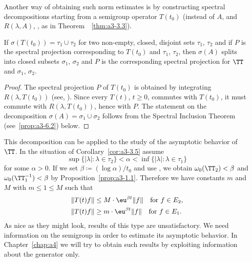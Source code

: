 Another way of obtaining such norm estimates is by constructing spectral decompositions starting from a semigroup operator $T(t_{0})$ (instead of\/ $A$, and $R(\lambda,A)$, \resp, as in Theorem~~\ref{thm:a3-3.3}).
\begin{corollary}\label{cor:a3-3.5}
If\/ $\sigma(T(t_{0})) = \tau_{1} \cup \tau_{2}$ for two non-empty, closed, disjoint sets $\tau_{1}$, $\tau_{2}$ and if\/ $P$ is the spectral projection corresponding to $T(t_{0})$ and $\tau_{1}$, $\tau_{2}$, then $\sigma(A)$ splits into closed subsets $\sigma_{1}$, $\sigma_{2}$ and $P$ is the corresponding spectral projection for $\TT$ and $\sigma_{1}$, $\sigma_{2}$.
\end{corollary}
\begin{proof}
The spectral projection $P$ of\/ $T(t_{0})$ is obtained by integrating $R(\lambda,T(t_{0}))$ (see, \eg \textcite[Section VII.3]{dunfordschwartz:1958}).
Since every $T(t)$, $t \geq 0$, commutes with $T(t_{0})$, it must commute with $R(\lambda,T(t_{0}))$, hence with $P$.
The statement on the decomposition $\sigma(A) = \sigma_{1} \cup \sigma_{2}$ follows from the Spectral Inclusion Theorem (see~\ref{prop:a3-6.2}) below.
\end{proof}
This decomposition can be applied to the study of the asymptotic behavior of\/ $\TT$. In the situation of Corollary~\ref{cor:a3-3.5} assume
\[
\sup \{|\lambda| \colon \lambda \in \tau_{2}\} < \alpha < \inf \{|\lambda| \colon \lambda \in \tau_{1}\} 
\]
for some $\alpha > 0$. 
If we set $\beta \coloneqq (\log\alpha)/t_{0}$ and use 
\textcite[Chap.I, Theorem~6.5]{pazy:1983}, 
we obtain $\omega_{0}(\TT_{2}) < \beta$ and $\omega_{0}(\TT_{1}^{-1}) < \beta$ by Proposition~\ref{prop:a3-1.1}.
Therefore we have constants $m$ and $M$ with $m \leq 1 \leq M $ such that
\begin{align*}
	\|T(t)f\| &\leq M \cdot \eu^{\beta t}\|f\| \quad \text{for } f \in E_{2} , \\
	\|T(t)f\| &\geq m \cdot \eu^{\beta t}\|f\| \quad \text{for } f \in E_{1} .
\end{align*}
As nice as they might look, results of this type are unsatisfactory. We need information on the semigroup in order to estimate its asymptotic behavior.
In Chapter~\ref{chap:a4} we will try to obtain such results by exploiting information about the generator only.
